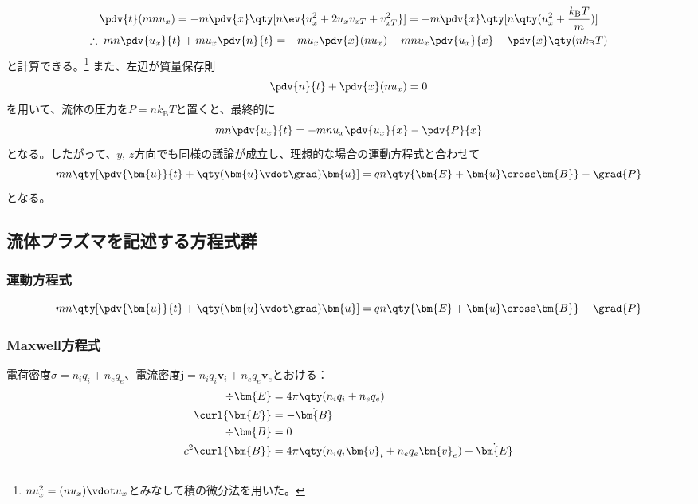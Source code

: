 \begin{gather}
	\pdv{t}(mnu_x)  = -m\pdv{x}\qty[n\ev{u_x^2 + 2u_xv_{xT} + v_{xT}^2}] = -m\pdv{x}\qty[n\qty(u_x^2 + \frac{k_\text{B}T}{m})] \\
	\therefore\; mn\pdv{u_x}{t} + mu_x\pdv{n}{t} = -mu_x\pdv{x}(nu_x) - mnu_x\pdv{u_x}{x} - \pdv{x}\qty(nk_{\text{B}}T)
\end{gather}
と計算できる。\footnote{$nu_x^2 = (nu_x)\vdot u_x$とみなして積の微分法を用いた。}
また、左辺が質量保存則
\begin{equation}
	\pdv{n}{t} + \pdv{x}(nu_x) = 0
\end{equation}
を用いて、流体の圧力を$P = nk_{\text{B}}T$と置くと、最終的に
\begin{equation}
	mn\pdv{u_x}{t} = - mnu_x\pdv{u_x}{x} - \pdv{P}{x}
\end{equation}
となる。したがって、$y,\,z$方向でも同様の議論が成立し、理想的な場合の運動方程式と合わせて
\begin{equation}
	mn\qty[\pdv{\bm{u}}{t} + \qty(\bm{u}\vdot\grad)\bm{u}] = qn\qty{\bm{E} + \bm{u}\cross\bm{B}} - \grad{P}
\end{equation}
となる。

\subsection{流体プラズマを記述する方程式群}
\subsubsection{運動方程式}
\begin{equation}
	mn\qty[\pdv{\bm{u}}{t} + \qty(\bm{u}\vdot\grad)\bm{u}] = qn\qty{\bm{E} + \bm{u}\cross\bm{B}} - \grad{P}
\end{equation}
\subsubsection{Maxwell方程式}
電荷密度$\sigma  = n_iq_i + n_eq_e$、電流密度$\bm{j} = n_iq_i\bm{v}_i + n_eq_e\bm{v}_e$とおける：
\begin{align}
	\div{\bm{E}}     & = 4\pi\qty(n_iq_i + n_eq_e)                                 \\
	\curl{\bm{E}}    & = -\dot{\bm{B}}                                             \\
	\div{\bm{B}}     & = 0                                                         \\
	c^2\curl{\bm{B}} & = 4\pi\qty(n_iq_i\bm{v}_i + n_eq_e\bm{v}_e)  + \dot{\bm{E}}
\end{align}

